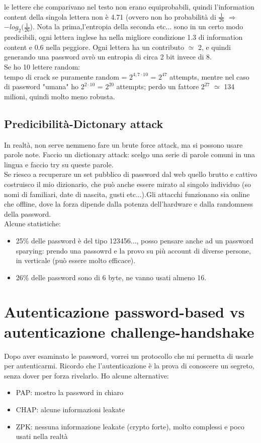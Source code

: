 \documentclass[16px]{article}
\begin{document}
le lettere che comparivano nel testo non erano equiprobabili, quindi l'information content della singola lettera non è 4.71 (ovvero non ho probabilità di $\frac{1}{26}$ $\Rightarrow$ $-log_{2}(\frac{1}{26}$). Nota la prima,l'entropia della seconda etc... sono in un certo modo predicibili, ogni lettera inglese ha nella migliore condizione 1.3 di information content e 0.6 nella peggiore. Ogni lettera ha un contributo $\simeq$ 2, e quindi generando una password avrò un entropia di circa 2 bit invece di 8.\\ Se ho 10 lettere random:\\
tempo di crack se puramente random = $2^{4,7 \cdot 10}$ = $2^{47}$ attempts, mentre nel caso di password "umana" ho $2^{2 \cdot 10}$ = $2^{20}$ attempts; perdo un fattore $2^27$ $\simeq$ 134 milioni, quindi molto meno robusta.
\subsection{Predicibilità-Dictonary attack}
In realtà, non serve nemmeno fare un brute force attack, ma si possono usare parole note. Faccio un dictionary attack: scelgo una serie di parole comuni in una lingua e faccio try su queste parole.\\ Se riesco a recuperare un set pubblico di password dal web quello brutto e cattivo costruisco il mio dizionario, che può anche essere mirato al singolo individuo (so nomi di familiari, date di nascita, gusti etc...).Gli attacchi funzionano sia online che offline, dove la forza dipende dalla potenza dell'hardware e dalla randomness della password.\\ Alcune statistiche:
\begin{itemize}
\item 25\% delle password è del tipo 123456..., posso pensare anche ad un password sparying: prendo una passowrd e la provo su più account di diverse persone, in verticale (può essere molto efficace).
\item 26\% delle password sono di 6 byte, ne vanno usati almeno 16.
\end{itemize}
\section{Autenticazione password-based vs autenticazione challenge-handshake}
Dopo aver esaminato le password, vorrei un protocollo che mi permetta di usarle per autenticarmi. Ricordo che l'autenticazione è la prova di conoscere un segreto, senza dover per forza rivelarlo. Ho alcune alternative:
\begin{itemize}
\item PAP: mostro la password in chiaro
\item CHAP: alcune informazioni leakate
\item ZPK: nessuna informazione leakate (crypto forte), molto complessi e poco usati nella realtà 
\end{itemize}
\end{document}
